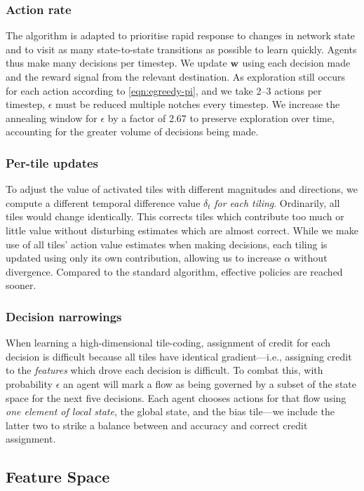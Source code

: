 \documentclass[10pt, times, conference, letterpaper]{IEEEtran}
\newcommand{\wvec}[1]{\ensuremath{\bm{w}_{#1}}}
\begin{document}
\subsubsection{Action rate}
The algorithm is adapted to prioritise rapid response to changes in network state and to visit as many state-to-state transitions as possible to learn quickly.
Agents thus make many decisions per timestep.
We update $\wvec{}$ using each decision made and the reward signal from the relevant destination.
As exploration still occurs for each action according to \cref{eqn:egreedy-pi}, and we take \numrange{2}{3} actions per timestep, $\epsilon$ must be reduced multiple notches every timestep.
We increase the annealing window for $\epsilon$ by a factor of \num{2.67} to preserve exploration over time, accounting for the greater volume of decisions being made.

\subsubsection{Per-tile updates}
To adjust the value of activated tiles with different magnitudes and directions, we compute a different temporal difference value $\delta_t$ \emph{for each tiling}.
Ordinarily, all tiles would change identically.
This corrects tiles which contribute too much or little value without disturbing estimates which are almost correct.
While we make use of all tiles' action value estimates when making decisions, each tiling is updated using only its own contribution, allowing us to increase $\alpha$ without divergence.
Compared to the standard algorithm, effective policies are reached sooner.

\subsubsection{Decision narrowings}
When learning a high-dimensional tile-coding, assignment of credit for each decision is difficult because all tiles have identical gradient---i.e., assigning credit to the \emph{features} which drove each decision is difficult.
To combat this, with probability $\epsilon$ an agent will mark a flow as being governed by a subset of the state space for the next five decisions.
Each agent chooses actions for that flow using \emph{one element of local state}, the global state, and the bias tile---we include the latter two to strike a balance between and accuracy and correct credit assignment.

\subsection{Feature Space}\label{sec:feature-space}
\end{document}
